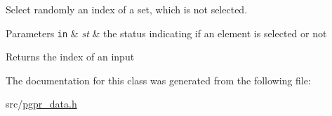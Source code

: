 Select randomly an index of a set, which is not selected. 


\begin{DoxyParams}[1]{Parameters}
\mbox{\tt in}  & {\em st} & the status indicating if an element is selected or not \\
\hline
\end{DoxyParams}
\begin{DoxyReturn}{Returns}
the index of an input 
\end{DoxyReturn}


The documentation for this class was generated from the following file\+:\begin{DoxyCompactItemize}
\item 
src/\hyperlink{pgpr__data_8h}{pgpr\+\_\+data.\+h}\end{DoxyCompactItemize}
